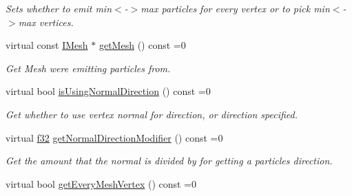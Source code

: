 \begin{DoxyCompactItemize}
\begin{DoxyCompactList}\small\item\em Sets whether to emit min$<$-\/$>$max particles for every vertex or to pick min$<$-\/$>$max vertices. \end{DoxyCompactList}\item 
\mbox{\label{classirr_1_1scene_1_1IParticleMeshEmitter_aedecba70f370878c757a1c95cfde52e9}} 
virtual const \hyperlink{classirr_1_1scene_1_1IMesh}{I\+Mesh} $\ast$ \hyperlink{classirr_1_1scene_1_1IParticleMeshEmitter_aedecba70f370878c757a1c95cfde52e9}{get\+Mesh} () const =0
\begin{DoxyCompactList}\small\item\em Get Mesh we\textquotesingle{}re emitting particles from. \end{DoxyCompactList}\item 
\mbox{\label{classirr_1_1scene_1_1IParticleMeshEmitter_a23d866a4cbfab5a3f7ab55636516d1e2}} 
virtual bool \hyperlink{classirr_1_1scene_1_1IParticleMeshEmitter_a23d866a4cbfab5a3f7ab55636516d1e2}{is\+Using\+Normal\+Direction} () const =0
\begin{DoxyCompactList}\small\item\em Get whether to use vertex normal for direction, or direction specified. \end{DoxyCompactList}\item 
\mbox{\label{classirr_1_1scene_1_1IParticleMeshEmitter_aded144f185ab40a4b45371e3686e802b}} 
virtual \hyperlink{namespaceirr_a0277be98d67dc26ff93b1a6a1d086b07}{f32} \hyperlink{classirr_1_1scene_1_1IParticleMeshEmitter_aded144f185ab40a4b45371e3686e802b}{get\+Normal\+Direction\+Modifier} () const =0
\begin{DoxyCompactList}\small\item\em Get the amount that the normal is divided by for getting a particles direction. \end{DoxyCompactList}\item 
\mbox{\label{classirr_1_1scene_1_1IParticleMeshEmitter_a394a9a256d57daf168bf0d770d4d4396}} 
virtual bool \hyperlink{classirr_1_1scene_1_1IParticleMeshEmitter_a394a9a256d57daf168bf0d770d4d4396}{get\+Every\+Mesh\+Vertex} () const =0

\end{DoxyCompactItemize}
